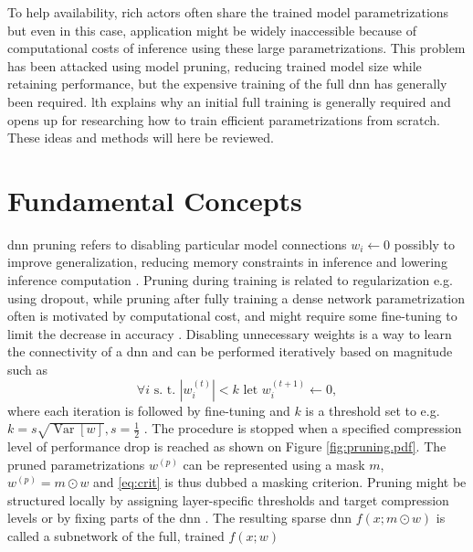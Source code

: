 \documentclass[12pt,fleqn,twocolumn]{article}
\newcommand{\half}{\ensuremath{\frac{1}{2}}}
\begin{document}
To help availability, rich actors often share the trained model parametrizations but even in this case, application might be widely inaccessible because of computational costs of inference using these large parametrizations.
This problem has been attacked using model pruning, reducing trained model size while retaining performance, but the expensive training of the full \acrshort{dnn} has generally been required.
\acrshort{lth} explains why an initial full training is generally required and opens up for researching how to train efficient parametrizations from scratch.
These ideas and methods will here be reviewed.

\section*{Fundamental Concepts}%
\acrshort{dnn} pruning refers to disabling particular model connections $w_i \leftarrow 0$ possibly to improve generalization, reducing memory constraints in inference and lowering inference computation \cite{LeCun1989OptimalBD}.
Pruning during training is related to regularization e.g. using dropout, while pruning after fully training a dense network parametrization often is motivated by computational cost, and might require some fine-tuning to limit the decrease in accuracy \cite{lange2020lth}.
Disabling unnecessary weights is a way to learn the connectivity of a \acrshort{dnn} and can be performed iteratively based on magnitude such as 
\begin{equation}\label{eq:crit}
    \forall i \text{ s. t. } |w_i^{(t)}|<k \text{ let } w_i^{(t+1)} \leftarrow 0,
\end{equation}
where each iteration is followed by fine-tuning and $k$ is a threshold set to e.g. $k=s\sqrt{\operatorname{Var}[w]}, s=\half$ \cite{han2015learning, nzmora2019distiller}. 
The procedure is stopped when a specified compression level of performance drop is reached \cite{han2015learning} as shown on Figure \ref{fig:pruning.pdf}.
The pruned parametrizations $w^{(p)}$ can be represented using a mask $m$, $w^{(p)} = m \odot w$ and \eqref{eq:crit} is thus dubbed a masking criterion.
Pruning might be structured locally by assigning layer-specific thresholds and target compression levels or by fixing parts of the \acrshort{dnn} \cite{han2015learning}.
The resulting sparse \acrshort{dnn} $f(x;m\odot w)$ is called a subnetwork of the full, trained $f(x;w)$
\end{document}
